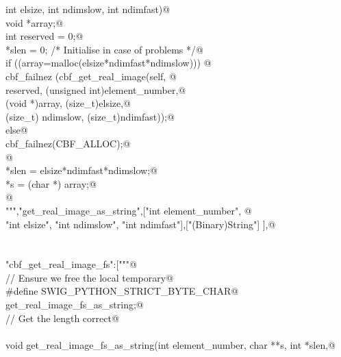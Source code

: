 \documentclass[10pt,a4paper,twoside,notitlepage]{article}
\begin{document}
\begin{flushleft}
\begin{minipage}{\linewidth}
\begin{list}{}{}
\mbox{}\verb@    int elsize, int ndimslow, int ndimfast){@\\
\mbox{}\verb@        void *array;@\\
\mbox{}\verb@        int reserved = 0;@\\
\mbox{}\verb@        *slen = 0; /* Initialise in case of problems */@\\
\mbox{}\verb@        if ((array=malloc(elsize*ndimfast*ndimslow))) {@\\
\mbox{}\verb@               cbf_failnez (cbf_get_real_image(self, @\\
\mbox{}\verb@               reserved, (unsigned int)element_number,@\\
\mbox{}\verb@               (void *)array, (size_t)elsize,@\\
\mbox{}\verb@               (size_t) ndimslow, (size_t)ndimfast));@\\
\mbox{}\verb@         }else{@\\
\mbox{}\verb@               cbf_failnez(CBF_ALLOC);@\\
\mbox{}\verb@         }@\\
\mbox{}\verb@        *slen = elsize*ndimfast*ndimslow;@\\
\mbox{}\verb@        *s = (char *) array;@\\
\mbox{}\verb@      }@\\
\mbox{}\verb@""","get_real_image_as_string",["int element_number", @\\
\mbox{}\verb@    "int elsize", "int ndimslow", "int ndimfast"],["(Binary)String"] ],@\\
\mbox{}\verb@@\\
\mbox{}\verb@@\\
\mbox{}\verb@"cbf_get_real_image_fs":["""@\\
\mbox{}\verb@// Ensure we free the local temporary@\\
\mbox{}\verb@%{@\\
\mbox{}\verb@#define SWIG_PYTHON_STRICT_BYTE_CHAR@\\
\mbox{}\verb@%}@\\
\mbox{}\verb@%cstring_output_allocate_size(char ** s, int *slen, free(*$1))@\\
\mbox{}\verb@       get_real_image_fs_as_string;@\\
\mbox{}\verb@// Get the length correct@\\
\mbox{}\verb@@\\
\mbox{}\verb@    void get_real_image_fs_as_string(int element_number, char **s, int *slen,@\\

\end{list}
\end{minipage}
\end{flushleft}
\end{document}
